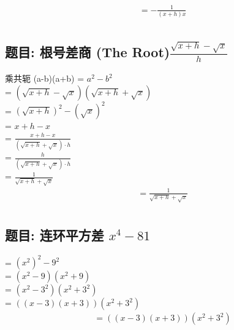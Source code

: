 \documentclass[12pt]{article}
\begin{document}
\begin{align*}
  &= -\frac{1}{(x+h)x} \\
\end{align*}


\subsection*{题目: 根号差商 (The Root)$\frac{\sqrt{x+h}-\sqrt{x}}{h}$}
乘共轭
(a-b)(a+b) = $a^{2}-b^{2}$ \\ 
= $(\sqrt{x+h} - \sqrt{x})(\sqrt{x+h} + \sqrt{x})$ \\  
= $(\sqrt{x+h})^{2} - (\sqrt{x})^{2}$ \\
= $x + h - x$ \\
= $\frac{x + h - x}{(\sqrt{x+h} + \sqrt{x}) \cdot h}$ \\
= $\frac{h}{(\sqrt{x+h} + \sqrt{x}) \cdot h}$ \\
= $\frac{1}{\sqrt{x+h} + \sqrt{x}}$ \\

\begin{align*}
  &=\frac{1}{\sqrt{x+h} + \sqrt{x}} \\
\end{align*}


\subsection*{题目: 连环平方差 $x^{4}-81$}
 = $(x^{2})^{2} - 9^{2}$ \\ 
 = $(x^{2} -9)(x^{2} + 9)$ \\ 
 = $(x^{2} -3^{2})(x^{2} + 3^{2})$ \\ 
 = $((x-3)(x + 3 ))(x^{2} + 3^{2})$\\ 

\begin{align*}
  &= ((x-3)(x + 3 ))(x^{2} + 3^{2}) \\
\end{align*}
\end{document}
